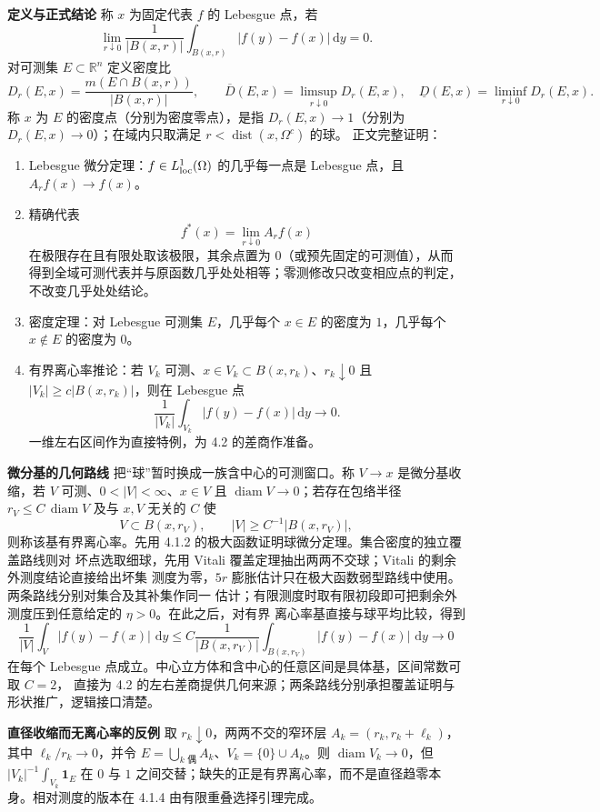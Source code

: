 \documentclass[11pt,a4paper]{ctexart}
\newcommand{\R}{\mathbb R}
\newcommand{\dd}{\,\mathrm d}
\newcommand{\dist}{\operatorname{dist}}
\newcommand{\diam}{\operatorname{diam}}
\newcommand{\planitem}[1]{\par\smallskip\noindent\textcolor{deepblue}{\textbf{#1}}\quad}
\begin{document}
\planitem{定义与正式结论}
称 $x$ 为固定代表 $f$ 的 Lebesgue 点，若
\[
\lim_{r\downarrow0}\frac1{|B(x,r)|}
\int_{B(x,r)}|f(y)-f(x)|\dd y=0.
\]
对可测集 $E\subset\R^n$ 定义密度比
\[
D_r(E,x)=\frac{m(E\cap B(x,r))}{|B(x,r)|},\qquad
\overline D(E,x)=\limsup_{r\downarrow0}D_r(E,x),\quad
\underline D(E,x)=\liminf_{r\downarrow0}D_r(E,x).
\]
称 $x$ 为 $E$ 的密度点（分别为密度零点），是指
$D_r(E,x)\to1$（分别为 $D_r(E,x)\to0$）；在域内只取满足
$r<\dist(x,\Omega^c)$ 的球。
正文完整证明：
\begin{enumerate}
\item Lebesgue 微分定理：$f\in L^1_{\rm loc}(\Omega)$ 的几乎每一点是 Lebesgue 点，且 $A_rf(x)\to f(x)$。
\item 精确代表
\[
f^*(x)=\lim_{r\downarrow0}A_rf(x)
\]
在极限存在且有限处取该极限，其余点置为 $0$（或预先固定的可测值），从而得到全域可测代表并与原函数几乎处处相等；零测修改只改变相应点的判定，不改变几乎处处结论。
\item 密度定理：对 Lebesgue 可测集 $E$，几乎每个 $x\in E$ 的密度为 $1$，几乎每个 $x\notin E$ 的密度为 $0$。
\item 有界离心率推论：若 $V_k$ 可测、$x\in V_k\subset B(x,r_k)$、$r_k\downarrow0$ 且
$|V_k|\ge c|B(x,r_k)|$，则在 Lebesgue 点
\[
\frac1{|V_k|}\int_{V_k}|f(y)-f(x)|\dd y\longrightarrow0.
\]
一维左右区间作为直接特例，为 4.2 的差商作准备。
\end{enumerate}

\planitem{微分基的几何路线}
把“球”暂时换成一族含中心的可测窗口。称 $V\to x$ 是微分基收缩，若
$V$ 可测、$0<|V|<\infty$、$x\in V$ 且 $\diam V\to0$；若存在包络半径
$r_V\le C\,\diam V$ 及与 $x,V$ 无关的 $C$ 使
\[
 V\subset B(x,r_V),\qquad |V|\ge C^{-1}|B(x,r_V)|,
\]
则称该基有界离心率。先用 4.1.2 的极大函数证明球微分定理。集合密度的独立覆盖路线则对
坏点选取细球，先用 Vitali 覆盖定理抽出两两不交球；Vitali 的剩余外测度结论直接给出坏集
测度为零，$5r$ 膨胀估计只在极大函数弱型路线中使用。两条路线分别对集合及其补集作同一
估计；有限测度时取有限初段即可把剩余外测度压到任意给定的 $\eta>0$。在此之后，对有界
离心率基直接与球平均比较，得到
\[
 \frac1{|V|}\int_V|f(y)-f(x)|\,\dd y
 \le C\frac1{|B(x,r_V)|}\int_{B(x,r_V)}|f(y)-f(x)|\,\dd y\longrightarrow0
\]
在每个 Lebesgue 点成立。中心立方体和含中心的任意区间是具体基，区间常数可取 $C=2$，
直接为 4.2 的左右差商提供几何来源；两条路线分别承担覆盖证明与形状推广，逻辑接口清楚。

\planitem{直径收缩而无离心率的反例}
取 $r_k\downarrow0$，两两不交的窄环层
$A_k=(r_k,r_k+\ell_k)$，其中 $\ell_k/r_k\to0$，并令
$E=\bigcup_{k\text{ 偶}}A_k$、$V_k=\{0\}\cup A_k$。则
$\diam V_k\to0$，但 $|V_k|^{-1}\int_{V_k}\mathbf1_E$ 在 $0$ 与 $1$ 之间交替；缺失的正是有界离心率，而不是直径趋零本身。相对测度的版本在 4.1.4 由有限重叠选择引理完成。
\end{document}
